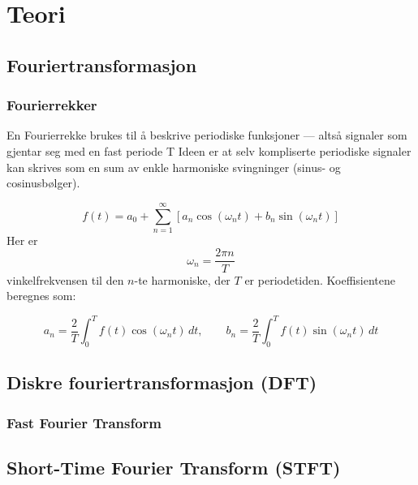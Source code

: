 \section{Teori}

\subsection{Fouriertransformasjon}

\subsubsection{Fourierrekker}
En Fourierrekke brukes til å beskrive periodiske funksjoner
— altså signaler som gjentar seg med en fast periode T
Ideen er at selv kompliserte periodiske signaler kan skrives 
som en sum av enkle harmoniske svingninger 
(sinus- og cosinusbølger). 

\[
f(t) = a_0 + \sum_{n=1}^{\infty} \left[ a_n \cos(\omega_n t) + b_n \sin(\omega_n t) \right]
\]
Her er 
\[
\omega_n = \frac{2\pi n}{T}
\]
vinkelfrekvensen til den $n$-te harmoniske, der $T$ er periodetiden. 
Koeffisientene beregnes som:

\[
a_n = \frac{2}{T} \int_{0}^{T} f(t)\cos(\omega_n t)\,dt, \qquad
b_n = \frac{2}{T} \int_{0}^{T} f(t)\sin(\omega_n t)\,dt
\]



\subsection{Diskre fouriertransformasjon (DFT)}

\subsubsection{Fast Fourier Transform}

\subsection{Short-Time Fourier Transform (STFT)}

